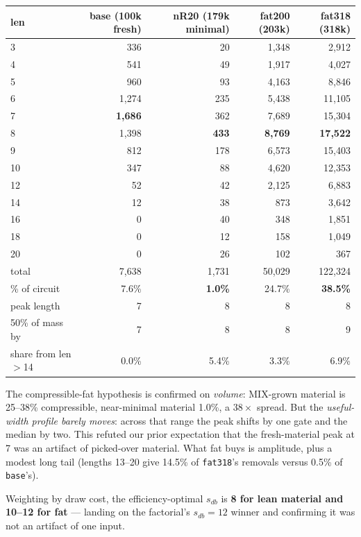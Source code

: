 \documentclass[11pt]{article}
\newcommand{\code}[1]{\texttt{#1}}
\begin{document}
\begin{table}[h]\centering\small
\begin{tabular}{lrrrr}
\toprule
len & base (100k fresh) & nR20 (179k minimal) & fat200 (203k) & fat318 (318k) \\
\midrule
3 & 336 & 20 & 1{,}348 & 2{,}912 \\
4 & 541 & 49 & 1{,}917 & 4{,}027 \\
5 & 960 & 93 & 4{,}163 & 8{,}846 \\
6 & 1{,}274 & 235 & 5{,}438 & 11{,}105 \\
7 & \textbf{1{,}686} & 362 & 7{,}689 & 15{,}304 \\
8 & 1{,}398 & \textbf{433} & \textbf{8{,}769} & \textbf{17{,}522} \\
9 & 812 & 178 & 6{,}573 & 15{,}403 \\
10 & 347 & 88 & 4{,}620 & 12{,}353 \\
12 & 52 & 42 & 2{,}125 & 6{,}883 \\
14 & 12 & 38 & 873 & 3{,}642 \\
16 & 0 & 40 & 348 & 1{,}851 \\
18 & 0 & 12 & 158 & 1{,}049 \\
20 & 0 & 26 & 102 & 367 \\
\midrule
total & 7{,}638 & 1{,}731 & 50{,}029 & 122{,}324 \\
\% of circuit & 7.6\% & \textbf{1.0\%} & 24.7\% & \textbf{38.5\%} \\
peak length & 7 & 8 & 8 & 8 \\
50\% of mass by & 7 & 8 & 8 & 9 \\
share from len $>$14 & 0.0\% & 5.4\% & 3.3\% & 6.9\% \\
\bottomrule
\end{tabular}
\end{table}

The compressible-fat hypothesis is confirmed on \emph{volume}: MIX-grown
material is 25--38\% compressible, near-minimal material 1.0\%, a $38\times$
spread. But the \emph{useful-width profile barely moves}: across that range
the peak shifts by one gate and the median by two. This refuted our prior
expectation that the fresh-material peak at 7 was an artifact of picked-over
material. What fat buys is amplitude, plus a modest long tail (lengths 13--20
give 14.5\% of \code{fat318}'s removals versus 0.5\% of \code{base}'s).

Weighting by draw cost, the efficiency-optimal $s_{db}$ is \textbf{8 for lean
material and 10--12 for fat} --- landing on the factorial's $s_{db}=12$ winner
and confirming it was not an artifact of one input.
\end{document}
